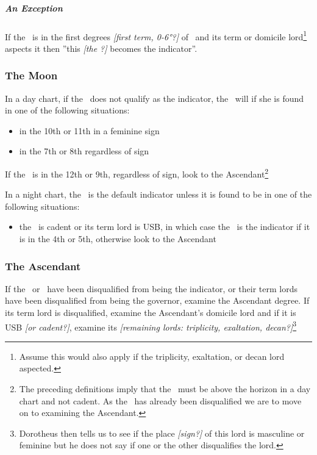 \subparagraph{An Exception}
If  the \Sun\, is in the first degrees \textsl{[first term, 0-6°?]} of \Aries\, and its term or domicile lord\footnote{Assume this would also apply if the triplicity, exaltation, or decan lord aspected.} aspects it then ''this \textsl{[the \Sun?]} becomes the indicator''.

\subsubsection{The Moon}
\vspace{-0.5em}
In a day chart, if the \Sun\, does not qualify as the indicator, the \Moon\, will if she is found in one of the following situations:
\begin{itemize}[topsep=0em,itemsep=0em]
\item {}in the 10th or 11th in a feminine sign
\item {}in the 7th or 8th regardless of sign
\end{itemize}
If the \Moon\, is in the 12th or 9th, regardless of sign, look to the Ascendant\footnote{The preceding definitions imply that the \Moon\, must be above the horizon in a day chart and not cadent. As the \Sun\, has already been disqualified we are to move on to examining the Ascendant.}

In a night chart, the \Moon\, is the default indicator unless it is found to be in one of the following situations:
\begin{itemize}[topsep=0em,itemsep=0em]
\item {}the \Moon\, is cadent or its term lord is USB, in which case the \Sun\, is the indicator if it is in the 4th or 5th, otherwise look to the Ascendant
\end{itemize}

\subsubsection{The Ascendant}
If the \Sun\, or \Moon\, have been disqualified from being the indicator, or their term lords have been disqualified from being the governor, examine the Ascendant degree. If its term lord is disqualified, examine the Ascendant's domicile lord and  if it is USB \textsl{[or cadent?]}, examine its \textsl{[remaining lords: triplicity, exaltation, decan?]}\footnote{Dorotheus then tells us to see if the place \textsl{[sign?]} of this lord is masculine or feminine but he does not say if one or the other disqualifies the lord.}

